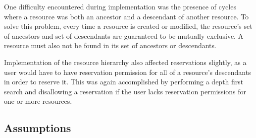\documentclass[12pt]{article}
\begin{document}
One difficulty encountered during implementation was the presence of cycles where a resource was both an ancestor and a descendant of another resource. To solve this problem, every time a resource is created or modified, the resource's set of ancestors and set of descendants are guaranteed to be mutually exclusive. A resource must also not be found in its set of ancestors or descendants. 

Implementation of the resource hierarchy also affected reservations slightly, as a user would have to have reservation permission for all of a resource's descendants in order to reserve it. This was again accomplished by performing a depth first search and disallowing a reservation if the user lacks reservation permissions for one or more resources.


\subsection{Assumptions}
\end{document}
